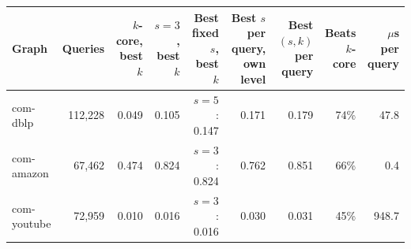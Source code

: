 \begin{tabular}{@{}lrrrrrrrr@{}}
\toprule
Graph & Queries & $k$-core, best $k$ & $s=3$, best $k$ & Best fixed $s$, best $k$ & Best $s$ per query, own level & Best $(s,k)$ per query & Beats $k$-core & $\mu$s per query \\
\midrule
com-dblp & 112,228 & 0.049 & 0.105 & $s=5$: 0.147 & 0.171 & 0.179 & 74\% & 47.8 \\
com-amazon & 67,462 & 0.474 & 0.824 & $s=3$: 0.824 & 0.762 & 0.851 & 66\% & 0.4 \\
com-youtube & 72,959 & 0.010 & 0.016 & $s=3$: 0.016 & 0.030 & 0.031 & 45\% & 948.7 \\
\bottomrule
\end{tabular}
